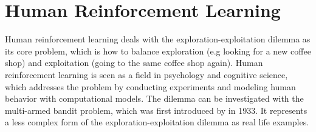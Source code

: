 \section{Human Reinforcement Learning}
Human reinforcement learning deals with the exploration-exploitation dilemma as its core problem, which is how to balance exploration (e.g looking for a new coffee shop) and exploitation (going to the same coffee shop again). Human reinforcement learning is seen as a field in psychology and cognitive science, which addresses the problem by conducting experiments and modeling human behavior with computational models. 
The dilemma can be investigated with the multi-armed bandit problem, which was first introduced by \cite{thompson1933likelihood} in 1933. It represents a less complex form of the exploration-exploitation dilemma as real life examples. 
   

